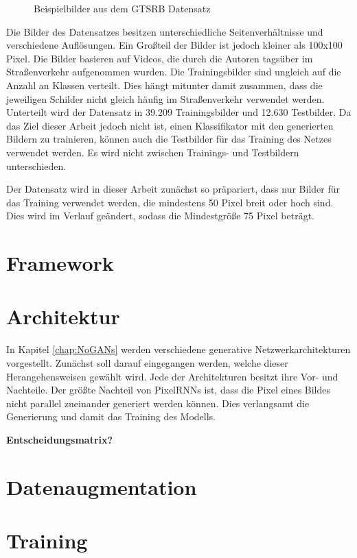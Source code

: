 \begin{figure}[H]
\begin{subfigure}[b]{0.125\textwidth}
    \caption{}
    \label{fig:gtrsb-paper-bsp-image-4}
\end{subfigure}
      \caption{Beispielbilder aus dem \acs{GTSRB} Datensatz \cite{GTSRB}}
      \label{fig:gtrsb-paper-bsp-images}
\end{figure}

Die Bilder des Datensatzes besitzen unterschiedliche Seitenverhältnisse und verschiedene Auflösungen. Ein Großteil der Bilder ist jedoch kleiner als 100x100 Pixel. Die Bilder basieren auf Videos, die durch die Autoren tagsüber im Straßenverkehr aufgenommen wurden. Die Trainingsbilder sind ungleich auf die Anzahl an Klassen verteilt. Dies hängt mitunter damit zusammen, dass die jeweiligen Schilder nicht gleich häufig im Straßenverkehr verwendet werden. Unterteilt wird der Datensatz in 39.209 Trainingsbilder und 12.630 Testbilder. Da das Ziel dieser Arbeit jedoch nicht ist, einen Klassifikator mit den generierten Bildern zu trainieren, können auch die Testbilder für das Training des Netzes verwendet werden. Es wird nicht zwischen Trainings- und Testbildern unterschieden. \cite{GTSRB}

Der Datensatz wird in dieser Arbeit zunächst so präpariert, dass nur Bilder für das Training verwendet werden, die mindestens 50 Pixel breit oder hoch sind. Dies wird im Verlauf geändert, sodass die Mindestgröße 75 Pixel beträgt.
\section{Framework}
\section{Architektur}
In Kapitel \ref{chap:NoGANs} werden verschiedene generative Netzwerkarchitekturen vorgestellt. Zunächst soll darauf eingegangen werden, welche dieser Herangehensweisen gewählt wird. Jede der Architekturen besitzt ihre Vor- und Nachteile. Der größte Nachteil von \acp{PixelRNN} ist, dass die Pixel eines Bildes nicht parallel zueinander generiert werden können. Dies verlangsamt die Generierung und damit das Training des Modells.

\textbf{Entscheidungsmatrix?}

\section{Datenaugmentation}


\section{Training}